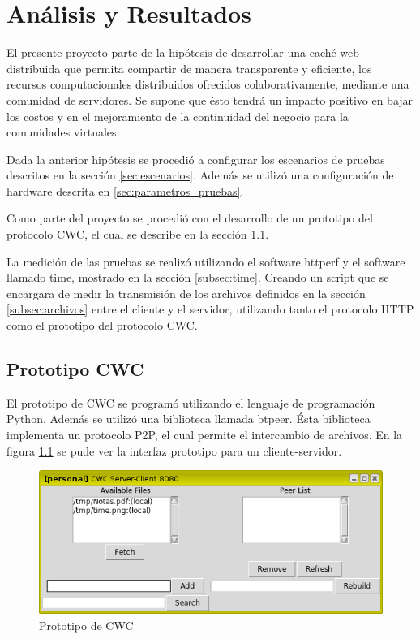 
\chapter{Análisis y Resultados} %
\label{ch:analisis_resutados} %

El presente proyecto parte de la hipótesis de desarrollar una caché web distribuida que permita compartir de manera transparente y eficiente, los recursos computacionales distribuidos ofrecidos colaborativamente, mediante una comunidad de servidores. Se supone que ésto tendrá un impacto positivo en bajar los costos y en el mejoramiento de la continuidad del negocio para la comunidades virtuales. 

Dada la anterior hipótesis se procedió a configurar los escenarios de pruebas descritos en la sección \ref{sec:escenarios}. Además se utilizó una configuración de hardware descrita en \ref{sec:parametros_pruebas}.

Como parte del proyecto se procedió con el desarrollo de un prototipo del protocolo CWC, el cual se describe en la sección \ref{sec:protitipo_cwc}.

La medición de las pruebas se realizó utilizando el software httperf y el software llamado time, mostrado en la sección \ref{subsec:time}. Creando un script que se encargara de medir la transmisión de los archivos definidos en la sección \ref{subsec:archivos} entre el cliente y el servidor, utilizando tanto el protocolo HTTP como el prototipo del protocolo CWC. 

\section{Prototipo CWC}
\label{sec:protitipo_cwc}

El prototipo de CWC se programó utilizando el lenguaje de programación Python. Además se utilizó una biblioteca llamada btpeer. Ésta biblioteca implementa un protocolo P2P, el cual permite el intercambio de archivos. En la figura \ref{cwc} se pude ver la interfaz prototipo para un cliente-servidor.

\begin{figure}[h]
  \centering
    \includegraphics[scale=0.75]{gfx/cwc}
  \caption{Prototipo de CWC}
  \label{cwc}
\end{figure}

